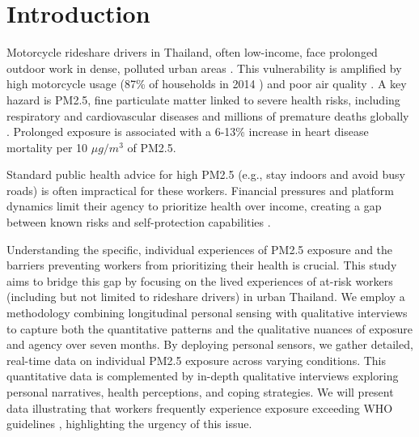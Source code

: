 \documentclass[sigconf,screen,natbib=true]{acmart}
\providecommand{\DIFaddbegin}{} %
\providecommand{\DIFaddend}{} %
\begin{document}
\section{Introduction}

\DIFaddbegin {}





\DIFaddend Motorcycle rideshare drivers in Thailand, often low-income, face prolonged outdoor work in dense, polluted urban areas \cite{tieanklin2024rideshare}.
This vulnerability is amplified by high motorcycle usage (87\% of households in 2014 \cite{Poushter2015motorcyclestat}) and poor air quality \cite{iqr_rank}.
A key hazard is PM2.5, fine particulate matter linked to severe health risks, including respiratory and cardiovascular diseases and millions of premature deaths globally \cite{who_ambient_air_pollution}.
Prolonged exposure is associated with a 6-13\% increase in heart disease mortality per 10 $\mu g/m^3$ of PM2.5.

Standard public health advice for high PM2.5 (e.g., stay indoors and avoid busy roads) \cite{cdc_pm25} is often impractical for these workers.
Financial pressures and platform dynamics limit their agency to prioritize health over income, creating a gap between known risks and self-protection capabilities \cite{tieanklin2024rideshare}.







Understanding the specific, individual experiences of PM2.5 exposure and the barriers preventing workers from prioritizing their health is crucial.
This study aims to bridge this gap by focusing on the lived experiences of at-risk workers (including but not limited to rideshare drivers) in urban Thailand.
We employ a methodology combining longitudinal personal sensing with qualitative interviews to capture both the quantitative patterns and the qualitative nuances of exposure and agency over seven months.
By deploying personal sensors, we gather detailed, real-time data on individual PM2.5 exposure across varying conditions.
This quantitative data is complemented by in-depth qualitative interviews exploring personal narratives, health perceptions, and coping strategies.
We will present data illustrating that workers frequently experience exposure exceeding WHO guidelines \cite{who_aqg_2021}, highlighting the urgency of this issue.
\end{document}
